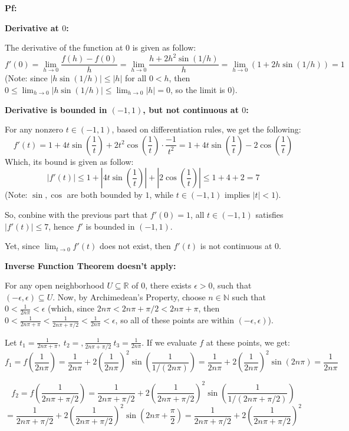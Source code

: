 \documentclass{article}
\begin{document}
\textbf{Pf:}

\textbf{Derivative at $0$:}

The derivative of the function at $0$ is given as follow:
$$f'(0)=\lim_{h\rightarrow 0}\frac{f(h)-f(0)}{h}=\lim_{h\rightarrow 0}\frac{h+2h^2\sin(1/h)}{h}=\lim_{h\rightarrow 0}(1+2h\sin(1/h))=1$$
(Note: since $|h\sin(1/h)|\leq |h|$ for all $0<h$, then $0\leq \lim_{h\rightarrow 0}|h\sin(1/h)|\leq \lim_{h\rightarrow 0}|h|=0$, so the limit is $0$).

\hfil

\textbf{Derivative is bounded in $(-1,1)$, but not continuous at $0$:}

For any nonzero $t\in (-1,1)$, based on differentiation rules, we get the following:
$$f'(t)=1+4t\sin\left(\frac{1}{t}\right) + 2t^2\cos\left(\frac{1}{t}\right)\cdot\frac{-1}{t^2} = 1+4t\sin\left(\frac{1}{t}\right)-2\cos\left(\frac{1}{t}\right)$$
Which, its bound is given as follow:
$$|f'(t)| \leq 1+\left|4t\sin\left(\frac{1}{t}\right)\right| + \left|2\cos\left(\frac{1}{t}\right)\right| \leq 1+4+2 = 7$$
(Note: $\sin,\cos$ are both bounded by $1$, while $t\in (-1,1)$ implies $|t|<1$).

So, conbine with the previous part that $f'(0)=1$, all $t\in (-1,1)$ satisfies $|f'(t)|\leq 7$, hence $f'$ is bounded in $(-1,1)$.

Yet, since $\lim_{t\rightarrow 0}f'(t)$ does not exist, then $f'(t)$ is not continuous at $0$.

\hfil

\textbf{Inverse Function Theorem doesn't apply:}

For any open neighborhood $U\subseteq \mathbb{R}$ of $0$, there exists $\epsilon>0$, such that $(-\epsilon,\epsilon)\subseteq U$. Now, by Archimedean's Property,
choose $n\in\mathbb{N}$ such that $0<\frac{1}{2n\pi}<\epsilon$ (which, since $2n\pi < 2n\pi +\pi/2 < 2n\pi +\pi$, then $0<\frac{1}{2n\pi +\pi}<\frac{1}{2n\pi +\pi/2}<\frac{1}{2n\pi}<\epsilon$, 
so all of these points are within $(-\epsilon,\epsilon)$).

Let $t_1=\frac{1}{2n\pi +\pi},\ t_2=,\frac{1}{2n\pi +\pi/2}\ t_3=\frac{1}{2n\pi}$. If we evaluate $f$ at these points, we get:
$$f_1=f\left(\frac{1}{2n\pi}\right)=\frac{1}{2n\pi}+2\left(\frac{1}{2n\pi}\right)^2\sin\left(\frac{1}{1/(2n\pi)}\right)=\frac{1}{2n\pi}+2\left(\frac{1}{2n\pi}\right)^2\sin(2n\pi) = \frac{1}{2n\pi}$$

$$f_2 = f\left(\frac{1}{2n\pi +\pi/2}\right)=\frac{1}{2n\pi +\pi/2}+2\left(\frac{1}{2n\pi +\pi/2}\right)^2\sin\left(\frac{1}{1/(2n\pi +\pi/2)}\right)$$
$$= \frac{1}{2n\pi +\pi/2}+2\left(\frac{1}{2n\pi +\pi/2}\right)^2\sin\left(2n\pi +\frac{\pi}{2}\right)=\frac{1}{2n\pi +\pi/2}+2\left(\frac{1}{2n\pi +\pi/2}\right)^2$$
\end{document}
